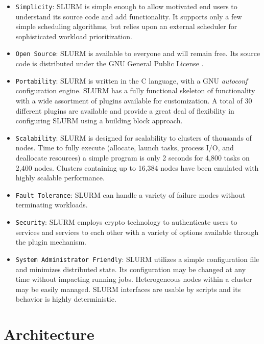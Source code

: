 \documentclass[10pt,onecolumn,times]{../common/llncs}
\begin{document}
{\begin{itemize}
\item {\tt Simplicity}: SLURM is simple enough to allow motivated 
end users to understand its source code and add functionality. 
It supports only a few simple scheduling algorithms, 
but relies upon an external scheduler for sophisticated
workload prioritization.

\item {\tt Open Source}: SLURM is available to everyone and 
will remain free.
Its source code is distributed under the GNU General Public
License \cite{GPL2002}.

\item {\tt Portability}: SLURM is written in the C language, 
with a GNU {\em autoconf} configuration engine.
SLURM has a fully functional skeleton of functionality with a
wide assortment of plugins available for customization. 
A total of 30 different plugins are available and provide a 
great deal of flexibility in configuring SLURM using a 
building block approach.

\item {\tt Scalability}: SLURM is designed for scalability to clusters 
of thousands of nodes. Time to fully execute (allocate, launch
tasks, process I/O, and deallocate resources) a simple program
is only 2 seconds for 4,800 tasks on 2,400 nodes. Clusters 
containing up to 16,384 nodes have been emulated with highly 
scalable performance. 

\item {\tt Fault Tolerance}: SLURM can handle a variety of failure
modes without terminating workloads.

\item {\tt Security}: SLURM employs crypto technology to authenticate
users to services and services to each other with a variety of options
available through the plugin mechanism.  

\item {\tt System Administrator Friendly}: SLURM utilizes
a simple configuration file and minimizes distributed state.
Its configuration may be changed at any time without impacting running
jobs.  Heterogeneous nodes within a cluster may be easily managed.  SLURM
interfaces are usable by scripts and its behavior is highly deterministic.

\end{itemize}

\section{Architecture}

}
\end{document}
